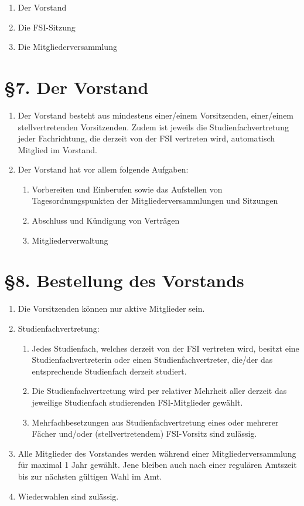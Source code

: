 \documentclass[12pt]{article}
\begin{document}
\begin{enumerate}
	\item
		Der Vorstand
	\item
		Die FSI-Sitzung
	\item
		Die Mitgliederversammlung
\end{enumerate}

\section*{§7. Der Vorstand}

\begin{enumerate}
		\item
		Der Vorstand besteht aus mindestens einer/einem Vorsitzenden, einer/einem stellvertretenden Vorsitzenden. Zudem ist jeweils die Studienfachvertretung jeder Fachrichtung, die derzeit von der FSI vertreten wird, automatisch Mitglied im Vorstand.
    	\item
		Der Vorstand hat vor allem folgende Aufgaben:
    		\begin{enumerate}[label=(\roman*)]
			\item
				Vorbereiten und Einberufen sowie das Aufstellen von
				Tagesordnungspunkten der Mitgliederversammlungen und Sitzungen
        		\item
				Abschluss und Kündigung von Verträgen
        		\item
				Mitgliederverwaltung
    		\end{enumerate}
\end{enumerate}

\section*{§8. Bestellung des Vorstands}

\begin{enumerate}
	\item
		Die Vorsitzenden können nur aktive Mitglieder sein.
	\item
	Studienfachvertretung:
	\begin{enumerate}[label=(\roman*)]
		\item
		Jedes Studienfach, welches derzeit von der FSI vertreten wird,
		besitzt eine Studienfachvertreterin oder einen
		Studienfachvertreter, die/der das entsprechende Studienfach
		derzeit studiert.
		\item
		Die Studienfachvertretung wird per relativer Mehrheit aller derzeit das jeweilige Studienfach studierenden FSI-Mitglieder gewählt.
		\item
		Mehrfachbesetzungen aus Studienfachvertretung eines oder mehrerer Fächer und/oder (stellvertretendem) FSI-Vorsitz sind zulässig.
	\end{enumerate}
	\item
		Alle Mitglieder des Vorstandes werden während einer
		Mitgliederversammlung für maximal 1 Jahr gewählt. Jene bleiben
		auch nach einer regulären Amtszeit bis zur nächsten gültigen
		Wahl im Amt.
	\item
		Wiederwahlen sind zulässig.
\end{enumerate}
\end{document}
